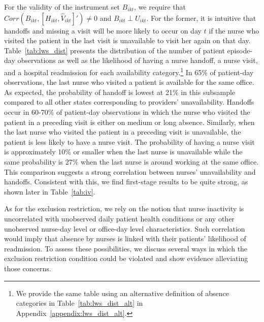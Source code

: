 \documentclass[final,12pt, notitlepage]{article}
\begin{document}
For the validity of the instrument set $B_{ikt}$, we require that $Corr(B_{ikt}, [ H_{ikt}, \hat{V}_{ikt} ]' ) \ne 0$ and $B_{ikt} \perp U_{ikt}.$
For the former, it is intuitive that handoffs and missing a visit will be more likely to occur on day $t$ if the nurse who visited the patient in the last visit is unavailable to visit her again on that day.
Table~\ref{tab:lws_dist} presents the distribution of the number of patient episode-day observations as well as the likelihood of having a nurse handoff, a nurse visit, and a hospital readmission for each availability category.\footnote{We provide the same table using an alternative definition of absence categories in Table~\ref{tab:lws_dist_alt} in Appendix~\ref{appendix:lws_dist_alt}.
}
In 65\% of patient-day observations, the last nurse who visited a patient is available for the same office. As expected, the probability of handoff is lowest at 21\% in this subsample compared to all other states corresponding to providers' unavailability.
Handoffs occur in 60-70\% of patient-day observations in which the nurse who visited the patient in a preceding visit is either on medium or long absence.
Similarly, when the last nurse who visited the patient in a preceding visit is unavailable, the patient is less likely to have a nurse visit.
The probability of having a nurse visit is approximately 10\% or smaller when the last nurse is unavailable while the same probability is 27\% when the last nurse is around working at the same office.
This comparison suggests a strong correlation between nurses' unavailability and handoffs.
Consistent with this, we find first-stage results to be quite strong, as shown later in Table~\ref{tab:iv}.

As for the exclusion restriction, we rely on the notion that nurse inactivity is uncorrelated with unobserved daily patient health conditions or any other unobserved nurse-day level or office-day level characteristics. Such correlation would imply that absence by nurses is linked with their patients' likelihood of readmission.
To assess these possibilities, we discuss several ways in which the exclusion restriction condition could be violated and show evidence alleviating those concerns.
\end{document}
